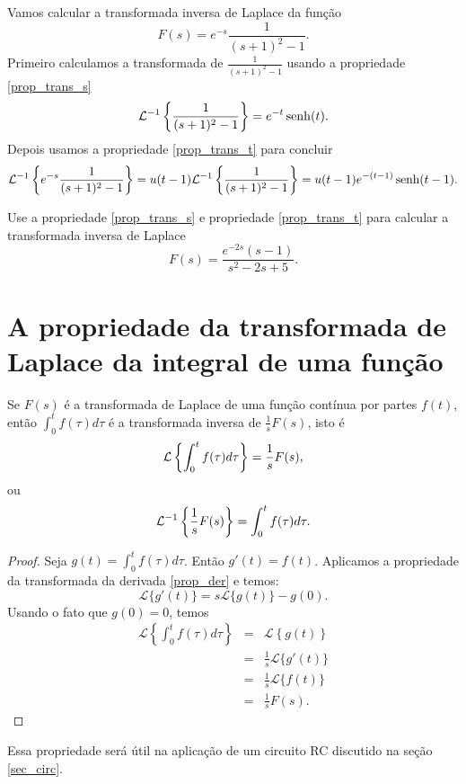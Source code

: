 \documentclass[Main.tex]{subfiles}
\begin{document}
\begin{ex} Vamos calcular a transformada inversa de Laplace da função
$$
F(s)=e^{-s}\frac{1}{(s+1)^2-1}.
$$
Primeiro calculamos a transformada de $\frac{1}{(s+1)^2-1}$ usando a propriedade \ref{prop_trans_s}
$$
\mathcal{L}^{-1}\left\{\frac{1}{(s+1)^2-1}\right\}=e^{-t}\operatorname{senh}(t).
$$
Depois usamos a propriedade \ref{prop_trans_t} para concluir
$$
\mathcal{L}^{-1}\left\{e^{-s}\frac{1}{(s+1)^2-1}\right\}=u(t-1)\mathcal{L}^{-1}\left\{\frac{1}{(s+1)^2-1}\right\}=u(t-1)e^{-(t-1)}\operatorname{senh}(t-1).
$$

\end{ex}
\begin{prob}Use a propriedade \ref{prop_trans_s} e propriedade \ref{prop_trans_t} para calcular a transformada inversa de Laplace
$$
F(s)=\frac{e^{-2s}(s-1)}{s^2 -2s+5}.
$$
\end{prob}

\section{A propriedade da transformada de Laplace da integral de uma função}
\begin{propr}{\label{prop_trans_int}}Se $F(s)$ é a transformada de Laplace de uma função contínua por partes $f(t)$, então $\int_0^tf(\tau)d\tau$ é a transformada inversa de $\frac{1}{s}F(s)$, isto é
\begin{equation}{\label{eq_trans_int}}
\mathcal{L}\left\{\int_0^tf(\tau)d\tau\right\} =\frac{1}{s}F(s),
\end{equation}
ou
\begin{equation}{\label{eq_trans_int_inv}}
\mathcal{L}^{-1} \left\{\frac{1}{s}F(s)\right\} =\int_0^tf(\tau)d\tau.
\end{equation} 
\end{propr}
\begin{proof}Seja $g(t)=\int_0^tf(\tau)d\tau$. Então $g'(t)=f(t)$. Aplicamos a propriedade da transformada da derivada \ref{prop_der} e temos:
$$
\mathcal{L}\{g'(t)\}=s\mathcal{L}\{g(t)\}-g(0).
$$
Usando o fato que $g(0)=0$, temos
\begin{eqnarray*}
\mathcal{L}\left\{\int_0^tf(\tau)d\tau\right\}&=&\mathcal{L}\left\{g(t)\right\}\\
&=&\frac{1}{s}\mathcal{L}\{g'(t)\}\\
&=&\frac{1}{s}\mathcal{L}\{f(t)\}\\
&=&\frac{1}{s}F(s).
\end{eqnarray*}
\end{proof}
Essa propriedade será útil na aplicação de um circuito RC discutido na seção \ref{sec_circ}.
\end{document}
